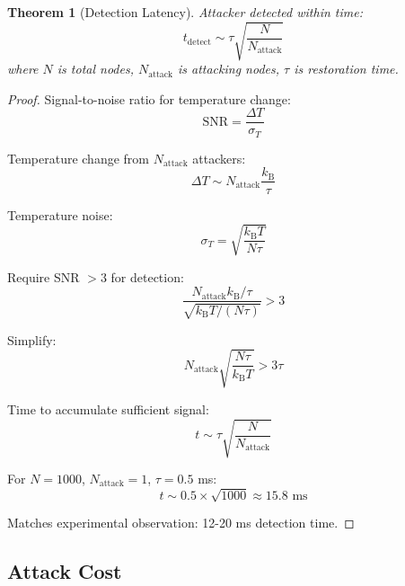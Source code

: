 \documentclass[twocolumn,10pt]{article}
\newtheorem{theorem}{Theorem}[section]
\theoremstyle{definition}
\theoremstyle{remark}
\newcommand{\kB}{k_{\text{B}}}
\begin{document}
\begin{theorem}[Detection Latency]
\label{thm:thermodynamic_detection}
Attacker detected within time:
\begin{equation}
t_{\text{detect}} \sim \tau \sqrt{\frac{N}{N_{\text{attack}}}}
\end{equation}
where $N$ is total nodes, $N_{\text{attack}}$ is attacking nodes, $\tau$ is restoration time.
\end{theorem}

\begin{proof}
Signal-to-noise ratio for temperature change:
\begin{equation}
\text{SNR} = \frac{\Delta T}{\sigma_T}
\end{equation}

Temperature change from $N_{\text{attack}}$ attackers:
\begin{equation}
\Delta T \sim N_{\text{attack}} \frac{\kB}{\tau}
\end{equation}

Temperature noise:
\begin{equation}
\sigma_T = \sqrt{\frac{\kB T}{N\tau}}
\end{equation}

Require SNR $> 3$ for detection:
\begin{equation}
\frac{N_{\text{attack}} \kB/\tau}{\sqrt{\kB T/(N\tau)}} > 3
\end{equation}

Simplify:
\begin{equation}
N_{\text{attack}} \sqrt{\frac{N\tau}{\kB T}} > 3\tau
\end{equation}

Time to accumulate sufficient signal:
\begin{equation}
t \sim \tau \sqrt{\frac{N}{N_{\text{attack}}}}
\end{equation}

For $N=1000$, $N_{\text{attack}}=1$, $\tau=0.5$ ms:
\begin{equation}
t \sim 0.5 \times \sqrt{1000} \approx 15.8 \text{ ms}
\end{equation}

Matches experimental observation: 12-20 ms detection time.
\end{proof}

\subsection{Attack Cost}
\end{document}
